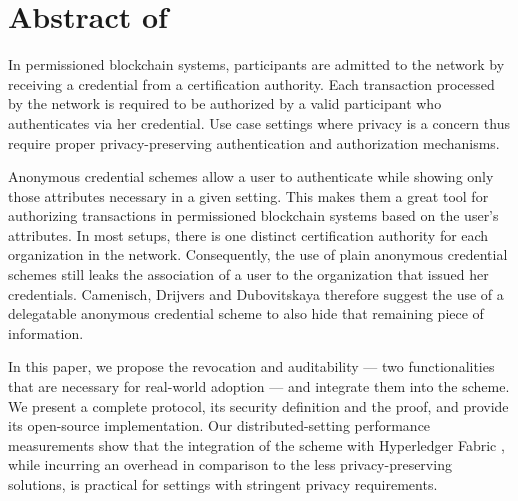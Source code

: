 

\chapter{Abstract of \cite{bogatov-idemix-2020}}\label{section:appendix:idemix-abstract}
\thispagestyle{myheadings}

	In permissioned blockchain systems, participants are admitted to the network by receiving a credential from a certification authority.
	Each transaction processed by the network is required to be authorized by a valid participant who authenticates via her credential.
	Use case settings where privacy is a concern thus require proper privacy-preserving authentication and authorization mechanisms.

	Anonymous credential schemes allow a user to authenticate while showing only those attributes necessary in a given setting.
	This makes them a great tool for authorizing transactions in permissioned blockchain systems based on the user's attributes.
	In most setups, there is one distinct certification authority for each organization in the network.
	Consequently, the use of plain anonymous credential schemes still leaks the association of a user to the organization that issued her credentials.
	Camenisch, Drijvers and Dubovitskaya \cite{delegatable-creds} therefore suggest the use of a delegatable anonymous credential scheme to also hide that remaining piece of information.

	In this paper, we propose the revocation and auditability --- two functionalities that are necessary for real-world adoption --- and integrate them into the scheme.
	We present a complete protocol, its security definition and the proof, and provide its open-source implementation.
	Our distributed-setting performance measurements show that the integration of the scheme with Hyperledger Fabric \cite{fabric}, while incurring an overhead in comparison to the less privacy-preserving solutions, is practical for settings with stringent privacy requirements.
